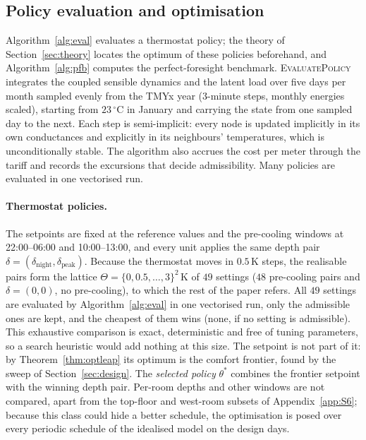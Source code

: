 \documentclass[10pt,a4paper,twocolumn]{article}
\theoremstyle{definition}
\begin{document}
\subsection{Policy evaluation and optimisation}\label{sec:evaluation}
Algorithm~\ref{alg:eval} evaluates a thermostat policy; the theory of Section~\ref{sec:theory} locates the optimum of these policies beforehand, and Algorithm~\ref{alg:pfb} computes the perfect-foresight benchmark. \textsc{EvaluatePolicy} integrates the coupled sensible dynamics and the latent load over five days per month sampled evenly from the TMYx year ($3$-minute steps, monthly energies scaled), starting from $23\,^{\circ}$C in January and carrying the state from one sampled day to the next. Each step is semi-implicit: every node is updated implicitly in its own conductances and explicitly in its neighbours' temperatures, which is unconditionally stable. The algorithm also accrues the cost per meter through the tariff and records the excursions that decide admissibility. Many policies are evaluated in one vectorised run.

\paragraph{Thermostat policies.}\label{alg:opt} The setpoints are fixed at the reference values and the pre-cooling windows at 22:00--06:00 and 10:00--13:00, and every unit applies the same depth pair $\delta=(\delta_{\text{night}},\delta_{\text{peak}})$. Because the thermostat moves in $0.5\,$K steps, the realisable pairs form the lattice $\Theta=\{0,0.5,\dots,3\}^2\,$K of $49$ settings ($48$ pre-cooling pairs and $\delta=(0,0)$, no pre-cooling), to which the rest of the paper refers. All $49$ settings are evaluated by Algorithm~\ref{alg:eval} in one vectorised run, only the admissible ones are kept, and the cheapest of them wins (none, if no setting is admissible). This exhaustive comparison is exact, deterministic and free of tuning parameters, so a search heuristic would add nothing at this size. The setpoint is not part of it: by Theorem~\ref{thm:optleap} its optimum is the comfort frontier, found by the sweep of Section~\ref{sec:design}. The \emph{selected policy} $\theta^\ast$ combines the frontier setpoint with the winning depth pair. Per-room depths and other windows are not compared, apart from the top-floor and west-room subsets of Appendix~\ref{app:S6}; because this class could hide a better schedule, the optimisation is posed over every periodic schedule of the idealised model on the design days.
\end{document}
